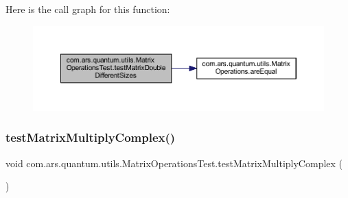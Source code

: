 Here is the call graph for this function\+:\nopagebreak
\begin{figure}[H]
\begin{center}
\leavevmode
\includegraphics[width=350pt]{classcom_1_1ars_1_1quantum_1_1utils_1_1_matrix_operations_test_a2263b15fae56de8579bc572cd67a5db2_cgraph}
\end{center}
\end{figure}
\hypertarget{classcom_1_1ars_1_1quantum_1_1utils_1_1_matrix_operations_test_aa87b6e37af0eb7ae67984f35548d64dc}{}\label{classcom_1_1ars_1_1quantum_1_1utils_1_1_matrix_operations_test_aa87b6e37af0eb7ae67984f35548d64dc} 
\subsubsection{\texorpdfstring{test\+Matrix\+Multiply\+Complex()}{testMatrixMultiplyComplex()}}
{\footnotesize\ttfamily void com.\+ars.\+quantum.\+utils.\+Matrix\+Operations\+Test.\+test\+Matrix\+Multiply\+Complex (\begin{DoxyParamCaption}{ }\end{DoxyParamCaption})}

